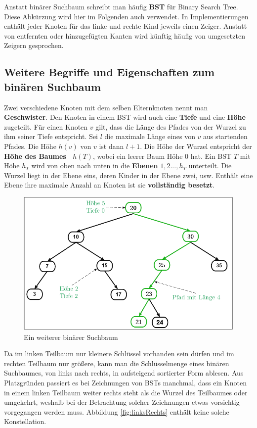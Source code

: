 \documentclass[a4paper,12pt]{article}
\begin{document}
\noindent Anstatt binärer Suchbaum schreibt man häufig \textbf{BST} für Binary Search Tree. Diese Abkürzung wird hier im Folgenden auch verwendet. In Implementierungen enthält jeder Knoten für das linke und rechte Kind jeweils einen Zeiger. Anstatt von entfernten oder hinzugefügten Kanten wird künftig häufig von umgesetzten Zeigern gesprochen. 	
\subsection{Weitere Begriffe und Eigenschaften zum binären Suchbaum}	
\noindent Zwei verschiedene Knoten mit dem selben Elternknoten nennt man \textbf{Geschwister}. Den Knoten in einem BST wird auch eine \textbf{Tiefe} und eine \textbf{Höhe} zugeteilt. Für einen Knoten $v$ gilt, dass die Länge des Pfades von der Wurzel zu ihm seiner Tiefe entspricht. Sei $l$ die maximale Länge eines von $v$ aus startenden Pfades. Die Höhe $\mathit{h(v)}$ von $v$ ist dann $l+1$. Die Höhe der Wurzel entspricht der \textbf{Höhe des Baumes~ $h(T)$}, wobei ein leerer Baum Höhe $0$ hat. Ein BST $T$ mit Höhe $h_T$ wird von oben nach unten in die \textbf{Ebenen} $\mathit{1,2...,h_T}$ unterteilt. Die Wurzel liegt in der Ebene eins, deren Kinder in der Ebene zwei, usw. Enthält eine Ebene ihre maximale Anzahl an Knoten ist sie \textbf{vollständig besetzt}.
\begin{figure}[H]
	\centering
	\includegraphics[width= 1\textwidth]{"Medien/Einleitung/suchbaum2_2"}
	\caption{Ein weiterer binärer Suchbaum }
	\label{fig:suchbaum2_2}
\end{figure}

\noindent Da im linken Teilbaum nur kleinere Schlüssel vorhanden sein dürfen und im rechten Teilbaum nur größere, kann man die Schlüsselmenge eines binären Suchbaumes, von links nach rechts, in aufsteigend sortierter Form ablesen. Aus Platzgründen passiert es bei Zeichnungen von BSTs manchmal, dass ein Knoten in einem linken Teilbaum weiter rechts steht als die Wurzel des Teilbaumes oder umgekehrt, weshalb bei der Betrachtung solcher Zeichnungen etwas vorsichtig vorgegangen werden muss. Abbildung \ref{fig:linksRechts} enthält keine solche Konstellation.  
\end{document}
